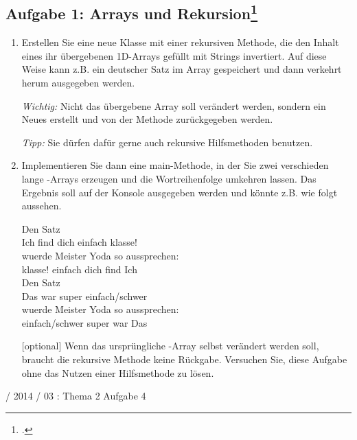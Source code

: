 \documentclass{lehramt-informatik}
\begin{document}
\begin{enumerate}
%

\section{Aufgabe 1: Arrays und Rekursion\footcite[Diese Aufgabe stammt
aus der Vorlesung Konzepte der Programmierung von Prof. Bernhard
Westfechtel der Universität Bayreuth, WS 2017/18, Übungsblatt 8 und
wurde dankenswerterweise zur Verwendung in diesem Aufgabenblatt zur
Verfügung gestellt.]{aud:ab:2}}

\begin{enumerate}

%

\item Erstellen Sie eine neue Klasse  mit einer
rekursiven Methode, die den Inhalt eines ihr übergebenen 1D-Arrays
gefüllt mit Strings invertiert. Auf diese Weise kann z.B. ein deutscher
Satz im Array gespeichert und dann verkehrt herum ausgegeben werden.

\emph{Wichtig:} Nicht das übergebene Array soll verändert werden,
sondern ein Neues erstellt und von der Methode zurückgegeben werden.

\emph{Tipp:} Sie dürfen dafür gerne auch rekursive Hilfsmethoden
benutzen.

%

\item Implementieren Sie dann eine main-Methode, in der Sie zwei
verschieden lange -Arrays erzeugen und die Wortreihenfolge
umkehren lassen. Das Ergebnis soll auf der Konsole ausgegeben werden
und könnte z.B. wie folgt aussehen.

\bigskip

{
\ttfamily
Den Satz\\
Ich find dich einfach klasse!\\
wuerde Meister Yoda so aussprechen:\\
klasse! einfach dich find Ich\\

Den Satz\\
Das war super einfach/schwer\\
wuerde Meister Yoda so aussprechen:\\
einfach/schwer super war Das
}

\bigskip

[optional] Wenn das ursprüngliche -Array selbst verändert
werden soll, braucht die rekursive Methode keine Rückgabe. Versuchen
Sie, diese Aufgabe ohne das Nutzen einer Hilfsmethode zu lösen.

\begin{antwort}
\end{antwort}
\end{enumerate}
\end{enumerate}

 / 2014 / 03 : Thema 2 Aufgabe 4

\literatur
\end{document}
